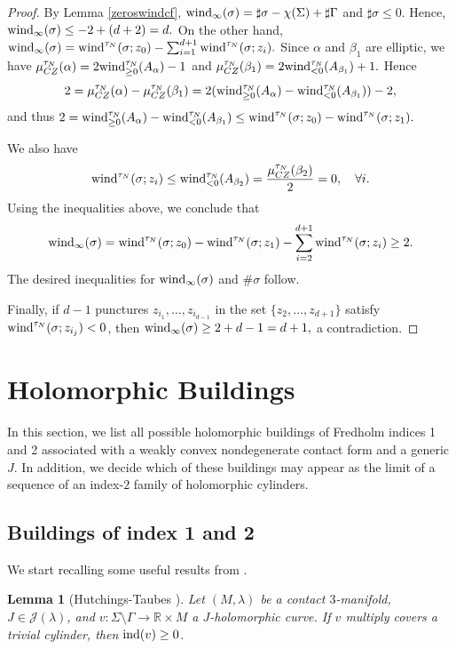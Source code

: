 \documentclass{amsart}
\newcommand{\R}{\mathbb{R}}
\newtheorem{lemma}[theorem]{Lemma}
\newcommand{\ind}{\textnormal{ind}}
\begin{document}
\begin{proof}
By Lemma \ref{zeroswindcf}, 
${\rm wind}_{\infty}(\sigma) = \sharp \sigma -\chi(\Sigma)+\sharp \Gamma$
and $\sharp \sigma \leq 0$. Hence,
${\rm wind}_{\infty}(\sigma) \leq -2+(d+2) = d.
$
 On the other hand,
${\rm wind}_{\infty}(\sigma)={\rm wind}^{\tau_N}(\sigma;z_0)-\sum_{i=1}^{d+1} {\rm wind}^{\tau_N}(\sigma;z_i). 
 $
Since $\alpha$ and $\beta_1$ are elliptic, we have
$
\mu_{CZ}^{\tau_N}(\alpha)=2 {\rm wind}^{\tau_N}_{\geq 0}(A_{\alpha})-1$ and $\mu_{CZ}^{\tau_N}(\beta_1) = 2{\rm wind}^{\tau_N}_{<0}(A_{\beta_1})+1.
$
Hence
$$
2= \mu_{CZ}^{\tau_N}(\alpha)-\mu_{CZ}^{\tau_N}(\beta_1)=2({\rm wind}^{\tau_N}_{\geq 0}(A_{\alpha})-{\rm wind}^{\tau_N}_{<0}(A_{\beta_1}))-2,
$$
and thus
$2= {\rm wind}^{\tau_N}_{\geq 0}(A_{\alpha})-{\rm wind}^{\tau_N}_{<0}(A_{\beta_1}) \leq {\rm wind}^{\tau_N}(\sigma; z_0) -{\rm wind}^{\tau_N}(\sigma; z_1).$

We also have
$$
{\rm wind}^{\tau_N}(\sigma;z_i) \leq {\rm wind}^{\tau_N}_{<0}(A_{\beta_2})=\frac{\mu_{CZ}^{\tau_N}(\beta_2)}{2}=0, \quad \forall i.
$$
Using the inequalities above, we conclude that
$$
{\rm wind}_{\infty}(\sigma) = {\rm wind}^{\tau_N}(\sigma;z_0) - {\rm wind}^{\tau_N}(\sigma;z_1) - \sum_{i=2}^{d+1} {\rm wind}^{\tau_N}(\sigma;z_i) \geq 2.
$$
The desired inequalities for ${\rm wind}_\infty(\sigma)$ and $\#\sigma$ follow.  

Finally, if $d-1$ punctures $z_{i_1}, \ldots, z_{i_{d-1}}$ in the set $\{z_2, \ldots, z_{d+1}\}$ satisfy ${\rm wind}^{\tau_N}(\sigma;z_{i_j})<0$, then
$
{\rm wind}_{\infty}(\sigma) \geq 2+d-1=d+1,
$
a contradiction.  
\end{proof}

\section{Holomorphic Buildings} \label{sec:index}
In this section, we list all possible holomorphic buildings of Fredholm indices 1 and 2 associated with a weakly convex nondegenerate contact form and a generic $J$. In addition, we decide which of these buildings may appear as the limit of a sequence of an index-$2$ family of holomorphic cylinders. 

\subsection{Buildings of index 1 and 2}
We start recalling some useful results from \cite{HN,HT07,W16}.


\begin{lemma}[Hutchings-Taubes \cite{HT07}] \label{1.7} 
Let $(M,\lambda)$ be a contact $3$-manifold, $J \in \mathcal{J}(\lambda)$, and $v:\Sigma \setminus \Gamma \to \R \times M$ a $J$-holomorphic curve. If $v$  multiply covers a trivial cylinder, then $\ind(v)\geq 0$.
\end{lemma}
\end{document}
